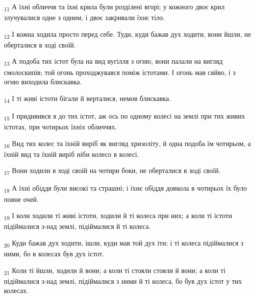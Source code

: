 \begin{tcolorbox}
\textsubscript{11} А їхні обличчя та їхні крила були розділені вгорі; у кожного двоє крил злучувалися одне з одним, і двоє закривали їхнє тіло.
\end{tcolorbox}
\begin{tcolorbox}
\textsubscript{12} І кожна ходила просто перед себе. Туди, куди бажав дух ходити, вони йшли, не оберталися в ході своїй.
\end{tcolorbox}
\begin{tcolorbox}
\textsubscript{13} А подоба тих істот була на вид вугілля з огню, вони палали на вигляд смолоскипів; той огонь проходжувався поміж істотами. І огонь мав сяйво, і з огню виходила блискавка.
\end{tcolorbox}
\begin{tcolorbox}
\textsubscript{14} І ті живі істоти бігали й верталися, немов блискавка.
\end{tcolorbox}
\begin{tcolorbox}
\textsubscript{15} І придивився я до тих істот, аж ось по одному колесі на землі при тих живих істотах, при чотирьох їхніх обличчях.
\end{tcolorbox}
\begin{tcolorbox}
\textsubscript{16} Вид тих колес та їхній виріб як вигляд хризоліту, й одна подоба їм чотирьом, а їхній вид та їхній виріб ніби колесо в колесі.
\end{tcolorbox}
\begin{tcolorbox}
\textsubscript{17} Вони ходили в ході своїй на чотири боки, не оберталися в ході своїй.
\end{tcolorbox}
\begin{tcolorbox}
\textsubscript{18} А їхні обіддя були високі та страшні; і їхнє обіддя довкола в чотирьох їх було повне очей.
\end{tcolorbox}
\begin{tcolorbox}
\textsubscript{19} І коли ходили ті живі істоти, ходили й ті колеса при них; а коли ті істоти підіймалися з-над землі, підіймалися й ті колеса.
\end{tcolorbox}
\begin{tcolorbox}
\textsubscript{20} Куди бажав дух ходити, ішли, куди мав той дух іти; і ті колеса підіймалися з ними, бо в колесах був дух істот.
\end{tcolorbox}
\begin{tcolorbox}
\textsubscript{21} Коли ті йшли, ходили й вони; а коли ті стояли стояли й вони; а коли ті підіймалися з-над землі, підіймалися з ними й ті колеса, бо був дух істот у тих колесах.
\end{tcolorbox}
